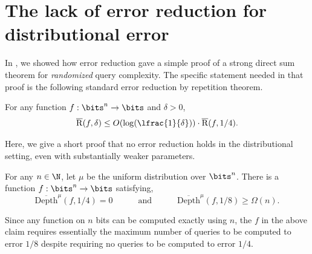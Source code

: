 \section{The lack of error reduction for distributional error}
\label{sec:no-boosting}
In , we showed how error reduction gave a simple proof of a strong direct sum theorem for \emph{randomized} query complexity. The specific statement needed in that proof is the following standard error reduction by repetition theorem.
\begin{fact}
    For any function $f:\bits^n \to \bits$ and $\delta > 0$,
    \begin{equation*}
        \overline{\mathrm{R}}(f,\delta) \leq O(\log(\lfrac{1}{\delta}))\cdot \overline{\mathrm{R}}(f,1/4).
    \end{equation*}
\end{fact}
Here, we give a short proof that no error reduction holds in the distributional setting, even with substantially weaker parameters.
\begin{claim}
    \label{claim:no-boosting}
    For any $n \in \N$, let $\mu$ be the uniform distribution over $\bits^n$. There is a function $f:\bits^n \to \bits$ satisfying,
    \begin{equation*}
        \overline{\mathrm{Depth}}^{\mu}(f,1/4) = 0 \quad\quad\quad\text{and}\quad\quad\quad \overline{\mathrm{Depth}}^{\mu}(f,1/8) \geq \Omega(n).
    \end{equation*}
\end{claim}
Since any function on $n$ bits can be computed exactly using $n$, the $f$ in the above claim requires essentially the maximum number of queries to be computed to error $1/8$ despite requiring no queries to be computed to error $1/4$.
